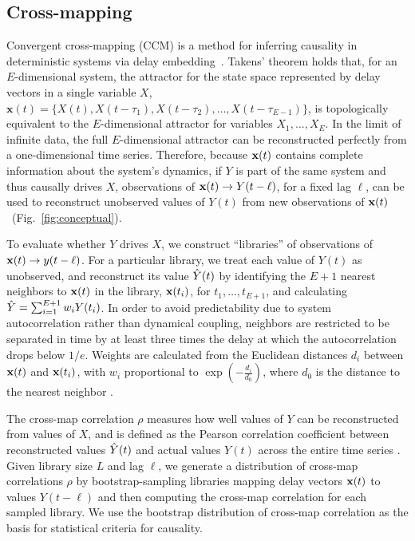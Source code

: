 \subsection*{Cross-mapping}

Convergent cross-mapping (CCM) is a method for inferring causality in deterministic systems via delay embedding~\cite{Sugihara2012}.
Takens' theorem holds that, for an $E$-dimensional system, the attractor for the state space represented by delay vectors in a single variable $X$, $\mathbf{x}(t) = \{X(t), X(t - \tau_1), X(t - \tau_2), \ldots , X(t - \tau_{E-1}) \}$, is topologically equivalent to the $E$-dimensional attractor for variables $X_1, ..., X_E$.
In the limit of infinite data, the full $E$-dimensional attractor can be reconstructed perfectly from a one-dimensional time series.
Therefore, because $\mathbf{x}(t)$ contains complete information about the system's dynamics, if $Y$ is part of the same system and thus causally drives $X$, observations of $\mathbf{x}(t) \rightarrow Y(t - \ell)$, for a fixed lag $\ell$, can be used to reconstruct unobserved values of $Y(t)$ from new observations of $\mathbf{x}(t)$~(Fig.~\ref{fig:conceptual}).

To evaluate whether $Y$ drives $X$, we construct ``libraries'' of observations of $\mathbf{x}(t) \rightarrow y(t - \ell)$.
For a particular library, we treat each value of $Y(t)$ as unobserved, and reconstruct its value $\hat{Y}(t)$ by identifying the $E + 1$ nearest neighbors to $\mathbf{x}(t)$ in the library, $\mathbf{x}(t_i)$, for $t_1, \ldots, t_{E+1}$, and calculating $\hat{Y} = \sum_{i = 1}^{E + 1} w_i Y(t_i)$.
In order to avoid predictability due to system autocorrelation rather than dynamical coupling, neighbors are restricted to be separated in time by at least three times the delay at which the autocorrelation drops below $1/e$.
Weights are calculated from the Euclidean distances $d_i$ between $\mathbf{x}(t)$ and $\mathbf{x}(t_i)$, with $w_i$ proportional to $\exp \left( -\frac{d_i}{d_0} \right)$, where $d_0$ is the distance to the nearest neighbor \cite{Sugihara2012}.

The cross-map correlation $\rho$ measures how well values of $Y$ can be reconstructed from values of $X$, and is defined as the Pearson correlation coefficient between reconstructed values $\hat{Y}(t)$ and actual values $Y(t)$ across the entire time series \cite{Ye2015}.
Given library size $L$ and lag $\ell$, we generate a distribution of cross-map correlations $\rho$ by bootstrap-sampling libraries mapping delay vectors $\mathbf{x}(t)$ to values $Y(t - \ell)$ and then computing the cross-map correlation for each sampled library.
We use the bootstrap distribution of cross-map correlation as the basis for statistical criteria for causality.

